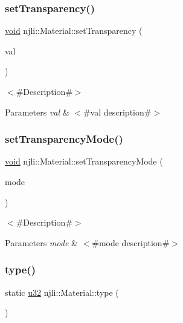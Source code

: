 \subsubsection{\texorpdfstring{set\+Transparency()}{setTransparency()}}
{\footnotesize\ttfamily \mbox{\hyperlink{_thread_8h_af1e856da2e658414cb2456cb6f7ebc66}{void}} njli\+::\+Material\+::set\+Transparency (\begin{DoxyParamCaption}\item[{const \mbox{\hyperlink{_util_8h_a5f6906312a689f27d70e9d086649d3fd}{f32}}}]{val }\end{DoxyParamCaption})}

$<$\#\+Description\#$>$


\begin{DoxyParams}{Parameters}
{\em val} & $<$\#val description\#$>$ \\
\hline
\end{DoxyParams}
\mbox{\label{classnjli_1_1_material_adfa835da63d259e393f16edf5e7e589a}} 
\subsubsection{\texorpdfstring{set\+Transparency\+Mode()}{setTransparencyMode()}}
{\footnotesize\ttfamily \mbox{\hyperlink{_thread_8h_af1e856da2e658414cb2456cb6f7ebc66}{void}} njli\+::\+Material\+::set\+Transparency\+Mode (\begin{DoxyParamCaption}\item[{const \mbox{\hyperlink{namespacenjli_ae6563db51402a0e02a3e55ef556afdd9}{njli\+Transparency\+Mode}}}]{mode }\end{DoxyParamCaption})}

$<$\#\+Description\#$>$


\begin{DoxyParams}{Parameters}
{\em mode} & $<$\#mode description\#$>$ \\
\hline
\end{DoxyParams}
\mbox{\label{classnjli_1_1_material_a94b5c1de306550320577208339a4bec6}} 
\subsubsection{\texorpdfstring{type()}{type()}}
{\footnotesize\ttfamily static \mbox{\hyperlink{_util_8h_a10e94b422ef0c20dcdec20d31a1f5049}{u32}} njli\+::\+Material\+::type (\begin{DoxyParamCaption}{ }\end{DoxyParamCaption})\hspace{0.3cm}{\ttfamily [static]}}

